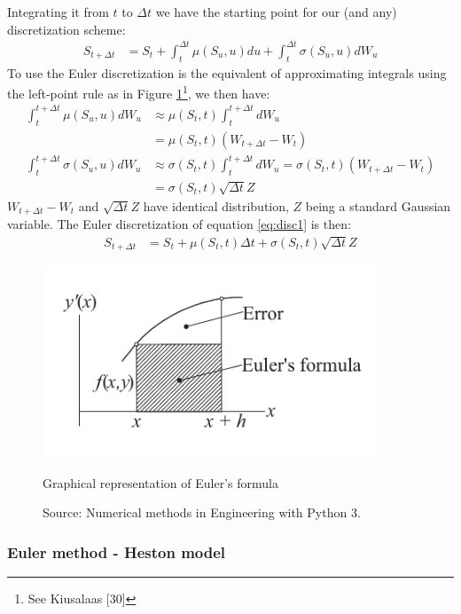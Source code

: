 \documentclass[12pt,twoside]{reedthesis}
\theoremstyle{definition}
\theoremstyle{definition}
\theoremstyle{remark}
\begin{document}
  Integrating it from \(t\) to \(\Delta t\) we have the starting point for
  our (and any) discretization scheme:
  \begin{align}
  \label{eq:disc1}
  S_{t+\Delta t} &= S_t + \int_{t}^{\Delta t}{\mu(S_u,u)}du + \int_{t}^{\Delta t}{\sigma(S_u,u)} dW_u
  \end{align}
  To use the Euler discretization is the equivalent of approximating
  integrals using the left-point rule as in Figure
  \ref{graph_euler}\footnote{See Kiusalaas {[}30{]}}, we then have:
  \begin{align*}
   \int_{t}^{t+\Delta t}{\mu(S_u,u)} dW_u &\approx \mu(S_t,t) \int_{t}^{t+\Delta t}dW_u\\
  &= \mu(S_t,t) (W_{t+\Delta t} - W_t)  \\
   \int_{t}^{t+\Delta t}{\sigma(S_u,u)} dW_u &\approx \sigma(S_t,t) \int_{t}^{t+\Delta t}dW_u 
  = \sigma(S_t,t) (W_{t+\Delta t} - W_t)  \\
  &= \sigma(S_t,t) \sqrt{\Delta t} Z
  \end{align*}
  \(W_{t+\Delta t}-W_t\) and \(\sqrt{\Delta t}Z\) have identical
  distribution, \(Z\) being a standard Gaussian variable. The Euler
  discretization of equation \eqref{eq:disc1} is then:
  \begin{align}
  \label{eq:disc2}
  S_{t+\Delta t} &= S_t + \mu(S_t,t)\Delta t + \sigma(S_t,t)\sqrt{\Delta t}Z
  \end{align}
  \begin{figure}
  \begin{center}
      \includegraphics[width=100mm]{figure/euler_screen.png}
      \caption{Graphical representation of Euler’s formula}\label{graph_euler}
      \caption*{\scriptsize{Source: Numerical methods in Engineering with Python 3.}}
  \end{center}
  \end{figure}
  \subsubsection{Euler method - Heston
  model}\label{euler-method---heston-model}
  
\end{document}
